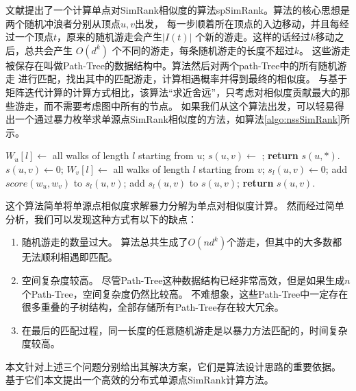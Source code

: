 \documentclass[master]{njuthesis}
\begin{document}
文献\cite{li2010fast}提出了一个计算单点对SimRank相似度的算法spSimRank。算法的核心思想是两个随机冲浪者分别从顶点$u,v$出发，
每一步顺着所在顶点的入边移动，并且每经过一个顶点$t$，原来的随机游走会产生$|I(t)|$ 个新的游走。这样的话经过$k$移动之后，总共会产生
$O(d^k)$ 个不同的游走，每条随机游走的长度不超过$k$。
这些游走被保存在叫做Path-Tree的数据结构中。算法然后对两个path-Tree中的所有随机游走
进行匹配，找出其中的匹配游走，计算相遇概率并得到最终的相似度。
与基于矩阵迭代计算的计算方式相比，该算法“求近舍远”，只考虑对相似度贡献最大的那些游走，而不需要考虑图中所有的节点。
如果我们从这个算法出发，可以轻易得出一个通过暴力枚举求单源点SimRank相似度的方法，如算法\ref{algo:nssSimRank}所示。

\begin{algorithm}[h]
\label{algo:nssSimRank}
\begin{algorithmic}[1]
		\State $W_u[l] \gets $ all walks of length $l$ starting from $u$;
	\EndFor
		\State $s(u,v)\gets$  ;
	\EndFor
	\State \textbf{return} $s(u, *)$.
\EndProcedure
{}
\State $s(u, v) \gets 0$;
	\State $W_v[l] \gets $ all walks of length $l$ starting from $v$;
	\State $s_l(u, v) \gets 0$;
			\State add  $score(w_u, w_v)$ to  $s_l(u, v)$;
		\EndIf
		\EndFor
	\EndFor
	\State add $s_l(u, v)$ to $s(u, v)$;
\EndFor
\State \textbf{return} $s(u, v)$.
\EndProcedure
\end{algorithmic}
\end{algorithm}

这个算法简单将单源点相似度求解暴力分解为单点对相似度计算。
然而经过简单分析，我们可以发现这种方式有以下的缺点：
\begin{enumerate}
\item 随机游走的数量过大。 算法总共生成了$O(nd^k)$个游走，但其中的大多数都无法顺利相遇即匹配。
\item 空间复杂度较高。 尽管Path-Tree这种数据结构已经非常高效，但是如果生成$n$个Path-Tree，空间复杂度仍然比较高。
不难想象，这些Path-Tree中一定存在很多重叠的子树结构，全部存储所有Path-Tree存在较大冗余。
\item 在最后的匹配过程，同一长度的任意随机游走是以暴力方法匹配的，时间复杂度较高。
\end{enumerate}
本文针对上述三个问题分别给出其解决方案，它们是算法设计思路的重要依据。 基于它们本文提出一个高效的分布式单源点SimRank计算方法。
\end{document}
